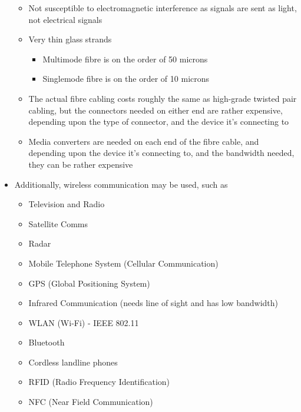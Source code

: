 \begin{itemize}
\begin{itemize}
    \item Not susceptible to electromagnetic interference as signals are sent as light, not electrical signals
    \item Very thin glass strands
    \begin{itemize}
      \item Multimode fibre is on the order of 50 microns
      \item Singlemode fibre is on the order of 10 microns
    \end{itemize}
    \item The actual fibre cabling costs roughly the same as high-grade twisted pair cabling, but the connectors needed on either end are rather expensive, depending upon the type of connector, and the device it's connecting to
    \item Media converters are needed on each end of the fibre cable, and depending upon the device it's connecting to, and the bandwidth needed, they can be rather expensive
  \end{itemize}
  \item Additionally, wireless communication may be used, such as
  \begin{itemize}
    \item Television and Radio
    \item Satellite Comms
    \item Radar
    \item Mobile Telephone System (Cellular Communication)
    \item GPS (Global Positioning System)
    \item Infrared Communication (needs line of sight and has low bandwidth)
    \item WLAN (Wi-Fi) - IEEE 802.11
    \item Bluetooth
    \item Cordless landline phones
    \item RFID (Radio Frequency Identification)
    \item NFC (Near Field Communication)
  \end{itemize}
\end{itemize}